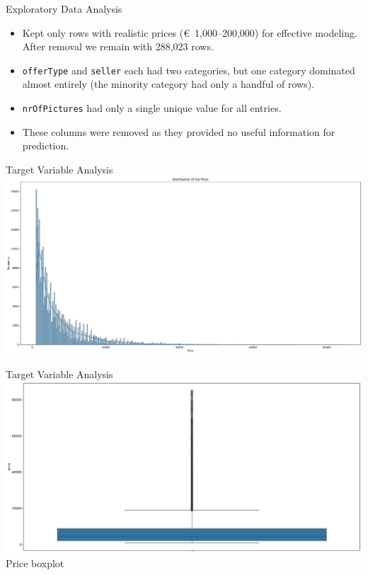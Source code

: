 \documentclass{beamer}
\begin{document}
\begin{frame}{Exploratory Data Analysis}
        \begin{itemize}
                \item Kept only rows with realistic prices (€~1,000–200,000) for
                        effective modeling. After removal we remain with
                        288,023 rows.
                \item \texttt{offerType} and \texttt{seller} each had two
                        categories, but one category dominated almost entirely
                        (the minority category had only a handful of rows).
                \item \texttt{nrOfPictures} had only a single unique value for
                        all entries.
                \item These columns were removed as they provided no useful
                        information for prediction.
        \end{itemize}
\end{frame}

\begin{frame}{Target Variable Analysis}
\includegraphics[scale=0.21]{car_price_distribution.pdf}
\end{frame}

\begin{frame}{Target Variable Analysis}
        \center
\includegraphics[scale=0.25]{car_price_boxplot.pdf}
\scriptsize 
Price boxplot
\end{frame}
\end{document}
